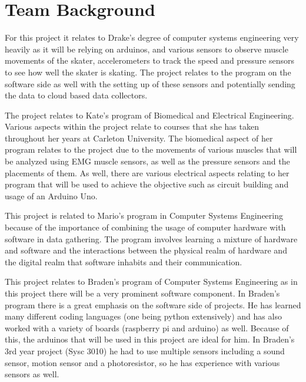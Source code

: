 \section{Team Background}
For this project it relates to Drake’s degree of computer systems engineering very heavily as it will be relying on arduinos, and various sensors to observe muscle movements of the skater, accelerometers to track the speed and pressure sensors to see how well the skater is skating. The project relates to the program on the software side as well with the setting up of these sensors and potentially sending the data to cloud based data collectors.

The project relates to Kate’s program of Biomedical and Electrical Engineering. Various aspects within the project relate to courses that she has taken throughout her years at Carleton University. The biomedical aspect of her program relates to the project due to the movements of various muscles that will be analyzed using EMG muscle sensors, as well as the pressure sensors and the placements of them. As well, there are various electrical aspects relating to her program that will be used to achieve the objective such as circuit building and usage of an Arduino Uno.

This project is related to Mario’s program in Computer Systems Engineering because of the importance of combining the usage of computer hardware with software in data gathering. The program involves learning a mixture of hardware and software and the interactions between the physical realm of hardware and the digital realm that software inhabits and their communication. 

This project relates to Braden’s program of Computer Systems Engineering as in this project there will be a very prominent software component. In Braden’s program there is a great emphasis on the software side of projects. He has learned many different coding languages (one being python extensively) and has also worked with a variety of boards (raspberry pi and arduino) as well. Because of this, the arduinos that will be used in this project are ideal for him. In Braden’s 3rd year project (Sysc 3010) he had to use multiple sensors including a sound sensor, motion sensor and a photoresistor, so he has experience with various sensors as well. 


